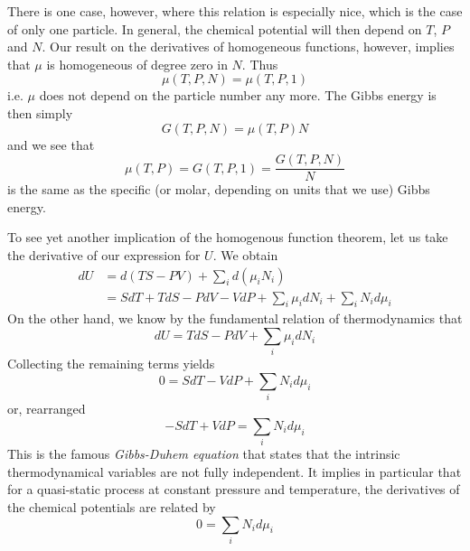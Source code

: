 \documentclass[a4paper, draft]{article}
\theoremstyle{own}
\theoremstyle{remark}
\begin{document}
There is one case, however, where this relation is especially nice, which is the case of only one particle. In general, the chemical potential will then depend on $T$, $P$ and $N$. Our result on the derivatives of homogeneous functions, however, implies that $\mu$ is homogeneous of degree zero in $N$. Thus
$$
\mu(T, P, N) = \mu(T, P, 1)
$$
i.e. $\mu$ does not depend on the particle number any more. The Gibbs energy is then simply 
$$
G(T, P, N) = \mu(T, P) N
$$
and we see that
$$
\mu(T, P) = G(T, P, 1) = \frac{G(T, P, N)}{N}
$$
is the same as the specific (or molar, depending on units that we use) Gibbs energy. 


To see yet another implication of the homogenous function theorem, let us take the derivative of our expression for $U$. We obtain
\begin{align*}
dU &= d(TS - PV) + \sum_i d(\mu_i N_i) \\
&= S dT + T dS - P dV - V dP + \sum_i \mu_i dN_i + \sum_i N_i d\mu_i 
\end{align*}
On the other hand, we know by the fundamental relation of thermodynamics that
$$
dU = T dS - P dV  + \sum_i \mu_i dN_i 
$$
Collecting the remaining terms yields
$$
0 = S dT  - V dP + \sum_i N_i d\mu_i 
$$
or, rearranged
$$
- S dT  + V dP = \sum_i N_i d\mu_i 
$$
This is the famous {\em Gibbs-Duhem equation} that states that the intrinsic thermodynamical variables are not fully independent. It implies in particular that for a quasi-static process at constant pressure and temperature, the derivatives of the chemical potentials are related by
$$
0 = \sum_i N_i d\mu_i 
$$


\end{document}
